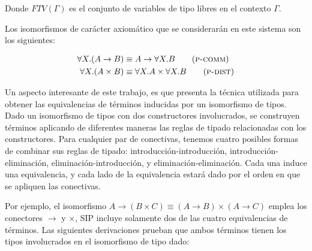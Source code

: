 Donde $FTV(\Gamma)$ es el conjunto de variables de tipo libres en el contexto $\Gamma$.

Los isomorfismos de carácter axiomático que se considerarán en este sistema son los siguientes:

\begin{align*}
	\forall X.(A \rightarrow B) &\equiv A \rightarrow \forall X.B \tag{\textsc{p-comm}} \\
	\forall X.(A \times B) &\equiv \forall X.A \times \forall X.B \tag{\textsc{p-dist}}
\end{align*}

Un aspecto interesante de este trabajo, es que presenta la técnica utilizada para obtener las equivalencias de términos inducidas por un isomorfismo de tipos.
Dado un isomorfismo de tipos con dos constructores involucrados, se construyen términos aplicando de diferentes maneras las reglas de tipado relacionadas con los constructores.
Para cualquier par de conectivas, tenemos cuatro posibles formas de combinar sus reglas de tipado: introducción-introducción, introducción-eliminación, eliminación-introducción, y eliminación-eliminación.
Cada una induce una equivalencia, y cada lado de la equivalencia estará dado por el orden en que se apliquen las conectivas.

Por ejemplo, el isomorfismo $A \rightarrow (B \times C) \equiv (A \rightarrow B) \times (A \rightarrow C)$ emplea los conectores $\rightarrow$ y $\times$, SIP incluye solamente dos de las cuatro equivalencias de términos.
Las siguientes derivaciones prueban que ambos términos tienen los tipos involucrados en el isomorfismo de tipo dado:

